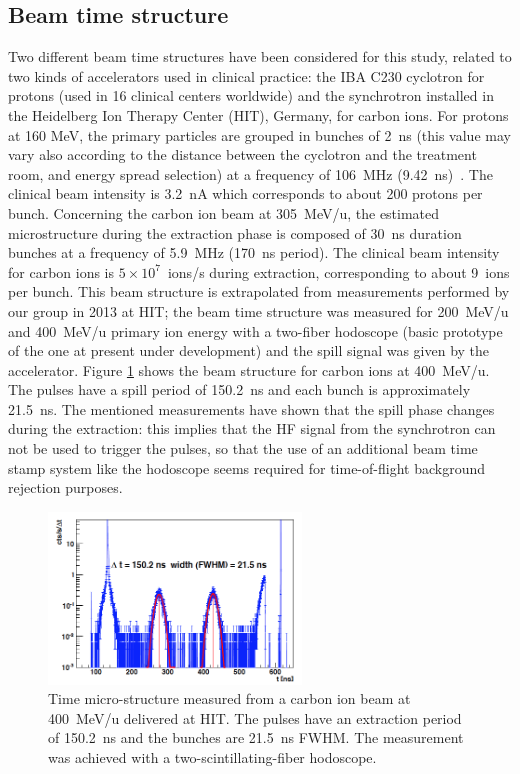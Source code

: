 \subsection{Beam time structure}
\label{subsection:modelisation_fasceau_ions_CC_hadrontherapy_Geant4}
 
Two different beam time structures have been considered for this study, related to two kinds of accelerators used in clinical practice: the IBA C230 cyclotron for protons (used in 16 clinical centers worldwide) and the synchrotron installed in the Heidelberg Ion Therapy Center (HIT), Germany, for carbon ions. For protons at 160 MeV, the primary particles are grouped in bunches of 2~ns (this value may vary also according to the distance between the cyclotron and the treatment room, and energy spread selection) at a frequency of 106~MHz (9.42~ns)~\cite{Roellinghoff_2014}. The clinical beam intensity is 3.2~nA which corresponds to about 200 protons per bunch. Concerning the carbon ion beam at 305~MeV/u, the estimated microstructure during the extraction phase is composed of 30~ns duration bunches at a frequency of 5.9~MHz (170~ns period). The clinical beam intensity for carbon ions is $5\times10^7$~ions/s during extraction, corresponding to about 9~ions per bunch. This beam structure is extrapolated from measurements performed by our group in 2013 at HIT; the beam time structure was measured for 200~MeV/u and 400~MeV/u primary ion energy with a two-fiber hodoscope (basic prototype of the one at present under development) and the spill signal was given by the accelerator. Figure \ref{fig:fig_structure_temps_faisceau_HIT_2013_CC_simulation_Hadronth} shows the beam structure for carbon ions at 400~MeV/u. The pulses have a spill period of 150.2~ns and each bunch is approximately 21.5~ns.
The mentioned measurements have shown that the spill phase changes during the extraction: this implies that the HF signal from the synchrotron can not be used to trigger the pulses, so that the use of an additional beam time stamp system like the hodoscope seems required for time-of-flight background rejection purposes.

\begin{figure} [!hbtp]	
  \centering
  \includegraphics[width=0.6\textwidth]{./Figure/2013_Structure_Time_Beam_400MeV.png}
  \caption{Time micro-structure measured from a carbon ion beam at 400~MeV/u delivered at HIT. The pulses have an extraction period of 150.2~ns and the bunches are 21.5~ns FWHM. The measurement was achieved with a two-scintillating-fiber hodoscope.}
  \label{fig:fig_structure_temps_faisceau_HIT_2013_CC_simulation_Hadronth}
\end{figure}


